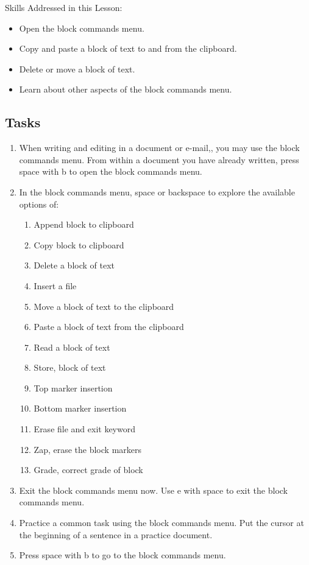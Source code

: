 \documentclass[10pt,letterpaper,twoside]{report}
\begin{document}
{{{Skills Addressed in this Lesson:
\begin{itemize}
	\item Open the block commands menu.
	\item Copy and paste a block of text to and from the clipboard.
	\item Delete or move a block of text.
	\item Learn about other aspects of the block commands menu.
\end{itemize}
\subsection{Tasks}
\begin{enumerate}
	\item When writing and editing in a document or e-mail,, you may use the block commands menu.  From within a document you have already written, press space with b to open the block commands menu.
	\item In the block commands menu, space or backspace to explore the available options of:
	      \begin{enumerate}
		      \item Append block to clipboard
		      \item Copy block to clipboard
		      \item Delete a block of text
		      \item Insert a file
		      \item Move a block of text to the clipboard
		      \item Paste a block of text from the clipboard
		      \item Read a block of text
		      \item Store, block of text
		      \item Top marker insertion
		      \item Bottom marker insertion
		      \item Erase file and exit keyword
		      \item Zap, erase the block markers
		      \item Grade, correct grade of block
	      \end{enumerate}
	\item Exit the block commands menu now.  Use e with space to exit the block commands menu.
	\item Practice a common task using the block commands menu.  Put the cursor at the beginning of a sentence in a practice document.
	\item Press space with b to go to the block commands menu.

\end{enumerate}}}}
\end{document}
